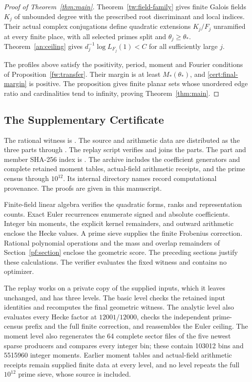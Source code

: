 \begin{proof}[Proof of Theorem~\ref{thm:main}]
Theorem~\ref{tw:field-family} gives finite Galois fields $K_j$ of unbounded
degree with the prescribed root discriminant and local indices. Their
actual complex conjugations define quadratic extensions $K_j/F_j$
unramified at every finite place, with all selected primes split and
$\theta_j\ge\theta_*$. Theorem~\ref{an:ceiling} gives
$d_j^{-1}\log L_{F_j}(1)<C$ for all sufficiently large $j$.

The profiles above satisfy the positivity, period, moment and Fourier
conditions of Proposition~\ref{fw:transfer}. Their margin is at least
$M_*(\theta_*)$, and \eqref{cert:final-margin} is positive. The
proposition gives finite planar sets whose unordered edge ratio and
cardinalities tend to infinity, proving Theorem~\ref{thm:main}.
\end{proof}

\subsection{The Supplementary Certificate}
The rational witness is . The source and arithmetic
data are distributed as the three parts
 through .
The replay script verifies and joins the parts. The part and
member SHA-256 index is .
The archive includes the
coefficient generators and complete retained moment tables, actual-field
arithmetic receipts, and the prime census through $10^{12}$. Its internal
directory names record computational provenance. The proofs are given
in this manuscript.

Finite-field linear algebra verifies the quadratic forms, ranks and
representation counts. Exact Euler recurrences enumerate signed and
absolute coefficients. Integer bin moments, the explicit kernel
remainders, and outward arithmetic enclose the Hecke values. A prime
sieve supplies the finite Frobenius correction. Rational polynomial
operations and the mass and overlap remainders of
Section~\ref{pf:section} enclose the geometric score. The preceding
sections justify these calculations. The verifier evaluates the fixed
witness and contains no optimizer.

The replay works on a private copy of the supplied inputs, which it
leaves unchanged, and has three levels. The basic level checks the
retained input identities and recomputes the final geometric witness.
The analytic level also evaluates every Hecke factor at $12001/12000$,
checks the independent prime-census prefix and the full finite
correction, and reassembles the Euler ceiling. The moment level also
regenerates the 64 complete sector files of the five newest sparse
producers and compares every integer bin; these contain 103012 bins and
5515960 integer moments. Earlier moment tables and actual-field
arithmetic receipts remain supplied finite data at every level, and no
level repeats the full $10^{12}$ prime sieve, whose source is included.

